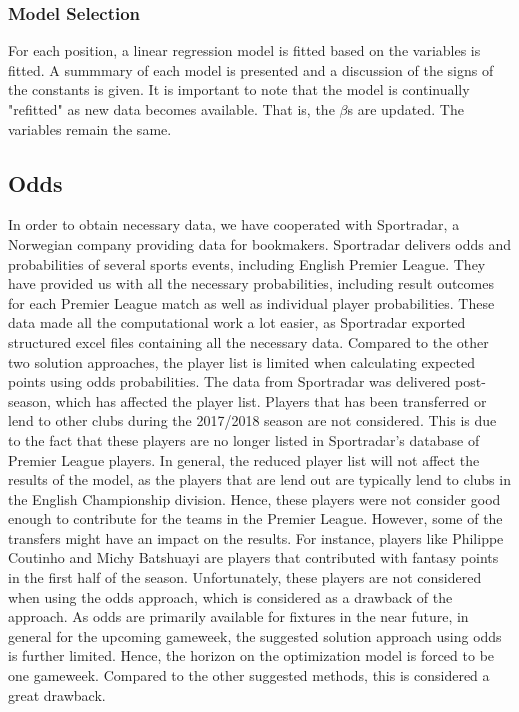 \subsubsection{Model Selection}

For each position, a linear regression model is fitted based on the variables is fitted. A summmary of each model is presented and a discussion of the signs of the constants is given. It is important to note that the model is continually "refitted" as new data becomes available. That is, the $\beta $s are updated. The variables remain the same. \newpar

\subsection{Odds}
In order to obtain necessary data, we have cooperated with Sportradar, a Norwegian company providing data for bookmakers. Sportradar delivers odds and probabilities of several sports events, including English Premier League. They have provided us with all the necessary probabilities, including result outcomes for each Premier League match as well as individual player probabilities. These data made all the computational work a lot easier, as Sportradar exported structured excel files containing all the necessary data. 
\newpar
Compared to the other two solution approaches, the player list is limited when calculating expected points using odds probabilities. The data from Sportradar was delivered post-season, which has affected the player list. Players that has been transferred or lend to other clubs during the 2017/2018 season are not considered. This is due to the fact that these players are no longer listed in Sportradar's database of Premier League players. In general, the reduced player list will not affect the results of the model, as the players that are lend out are typically lend to clubs in the English Championship division. Hence, these players were not consider good enough to contribute for the teams in the Premier League. However, some of the transfers might have an impact on the results. For instance, players like Philippe Coutinho and Michy Batshuayi are players that contributed with fantasy points in the first half of the season. Unfortunately, these players are not considered when using the odds approach, which is considered as a drawback of the approach.  
\newpar
As odds are primarily available for fixtures in the near future, in general for the upcoming gameweek, the suggested solution approach using odds is further limited. Hence, the horizon on the optimization model is forced to be one gameweek. Compared to the other suggested methods, this is considered a great drawback.

